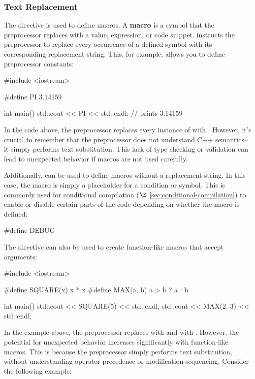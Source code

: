 \documentclass[12pt]{article}
\begin{document}
\subsubsection{Text Replacement }
\label{sec:text-replacement}

\noindent
The  directive is used to define macros.
A \textbf{macro} is a symbol that the preprocessor replaces with a value, expression, or code snippet.
 instructs the preprocessor to replace every occurrence of a defined symbol with its corresponding replacement string.
This, for example, allows you to define preprocessor constants:

\begin{cxx}{}
#include <iostream>

#define PI 3.14159

int main()
{
	std::cout << PI << std::endl; // prints 3.14159
}
\end{cxx}

\noindent
In the code above, the preprocessor replaces every instance of  with .
However, it's crucial to remember that the preprocessor does not understand C++ semantics--it simply performs text substitution.
This lack of type checking or validation can lead to unexpected behavior if macros are not used carefully.

\vspace{1em}
\noindent
Additionally,  can be used to define macros without a replacement string.
In this case, the macro is simply a placeholder for a condition or symbol.
This is commonly used for conditional compilation ($\S$ \ref{sec:conditional-compilation}) to enable or disable certain parts of the code depending on whether the macro is defined:

\begin{cxx}{}
#define DEBUG
\end{cxx}

\noindent
The  directive can also be used to create function-like macros that accept arguments:

\begin{cxx}{}
#include <iostream>

#define SQUARE(x) x * x
#define MAX(a, b) a > b ? a : b

int main()
{
    std::cout << SQUARE(5) << std::endl;
    std::cout << MAX(2, 3) << std::endl;
}
\end{cxx}

\noindent
\noindent In the example above, the preprocessor replaces  with  and  with .
However, the potential for unexpected behavior increases significantly with function-like macros.
This is because the preprocessor simply performs text substitution, without understanding operator precedence or modification sequencing.
Consider the following example:
\end{document}
